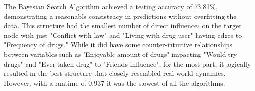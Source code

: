 \documentclass[conference]{IEEEtran}
\begin{document}
\begin{table}[h!]
\centering
\caption{Comparison of Bayesian Search, PC, and Greedy Thick-Thinning Algorithms}
\label{tab:algorithm_comparison}
\renewcommand{\arraystretch}{1.3}
\end{table}
The Bayesian Search Algorithm achieved a testing accuracy of 73.81\%, demonstrating a reasonable consistency in predictions without overfitting the data. This structure had the smallest number of direct influences on the target node with just "Conflict with law" and "Living with drug user" having edges to "Frequency of drugs." While it did have some counter-intuitive relationships between variables such as "Enjoyable amount of drugs" impacting "Would try drugs" and "Ever taken drug" to "Friends influence", for the most part, it logically resulted in the best structure that closely resembled real world dynamics. However, with a runtime of 0.937 it was the slowest of all the algorithms.
\end{document}
